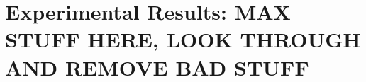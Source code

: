 \documentclass[journal,transmag]{IEEEtran}
\begin{document}
%



\section{Experimental Results: MAX STUFF HERE, LOOK THROUGH AND REMOVE BAD STUFF}
\end{document}
